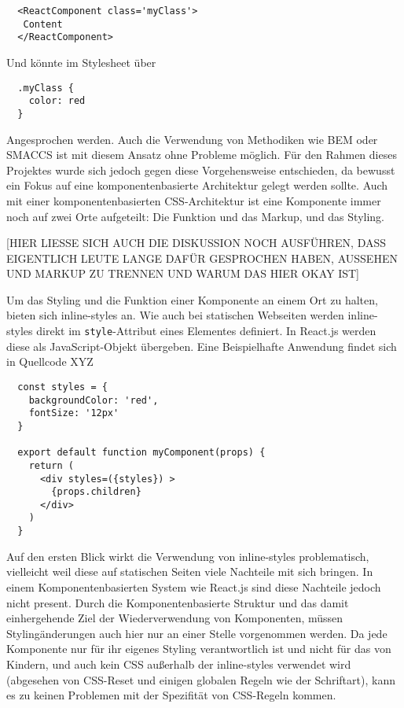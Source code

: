 \begin{lstlisting}
  <ReactComponent class='myClass'>
   Content
  </ReactComponent>
\end{lstlisting}

Und könnte im Stylesheet über

\begin{lstlisting}
  .myClass {
    color: red
  }
\end{lstlisting}

Angesprochen werden. Auch die Verwendung von Methodiken wie BEM oder SMACCS ist mit diesem Ansatz ohne Probleme möglich.
Für den Rahmen dieses Projektes wurde sich jedoch gegen diese Vorgehensweise entschieden, da bewusst ein Fokus auf eine komponentenbasierte Architektur gelegt werden sollte. Auch mit einer komponentenbasierten CSS-Architektur ist eine Komponente immer noch auf zwei Orte aufgeteilt: Die Funktion und das Markup, und das Styling.

[HIER LIESSE SICH AUCH DIE DISKUSSION NOCH AUSFÜHREN, DASS EIGENTLICH LEUTE LANGE DAFÜR GESPROCHEN HABEN, AUSSEHEN UND MARKUP ZU TRENNEN UND WARUM DAS HIER OKAY IST]

Um das Styling und die Funktion einer Komponente an einem Ort zu halten, bieten sich inline-styles an. Wie auch bei statischen Webseiten werden inline-styles direkt im \verb|style|-Attribut eines Elementes definiert. In React.js werden diese als JavaScript-Objekt übergeben. Eine Beispielhafte Anwendung findet sich in Quellcode XYZ

\begin{lstlisting}
  const styles = {
    backgroundColor: 'red',
    fontSize: '12px'
  }

  export default function myComponent(props) {
    return (
      <div styles=({styles}) >
  		{props.children}
  	  </div>
    )
  }
\end{lstlisting}

Auf den ersten Blick wirkt die Verwendung von inline-styles problematisch, vielleicht weil diese auf statischen Seiten viele Nachteile mit sich bringen. In einem Komponentenbasierten System wie React.js sind diese Nachteile jedoch nicht present. Durch die Komponentenbasierte Struktur und das damit einhergehende Ziel der Wiederverwendung von Komponenten, müssen Stylingänderungen auch hier nur an einer Stelle vorgenommen werden. Da jede Komponente nur für ihr eigenes Styling verantwortlich ist und nicht für das von Kindern, und auch kein CSS außerhalb der inline-styles verwendet wird (abgesehen von CSS-Reset und einigen globalen Regeln wie der Schriftart), kann es zu keinen Problemen mit der Spezifität von CSS-Regeln kommen.


